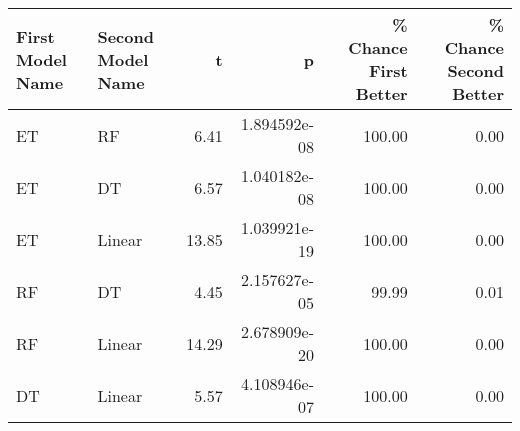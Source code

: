 \begin{tabular}{llrrrr}
\toprule
First Model Name & Second Model Name &     t &            p &  \% Chance First Better &  \% Chance Second Better \\
\midrule
              ET &                RF &  6.41 & 1.894592e-08 &                 100.00 &                    0.00 \\
              ET &                DT &  6.57 & 1.040182e-08 &                 100.00 &                    0.00 \\
              ET &            Linear & 13.85 & 1.039921e-19 &                 100.00 &                    0.00 \\
              RF &                DT &  4.45 & 2.157627e-05 &                  99.99 &                    0.01 \\
              RF &            Linear & 14.29 & 2.678909e-20 &                 100.00 &                    0.00 \\
              DT &            Linear &  5.57 & 4.108946e-07 &                 100.00 &                    0.00 \\
\bottomrule
\end{tabular}
